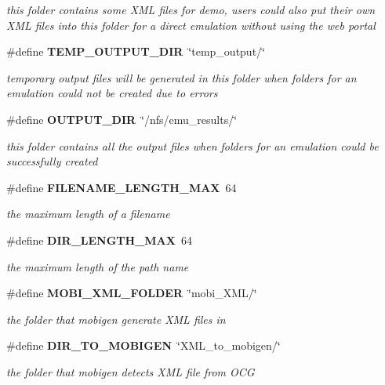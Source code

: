 \begin{CompactItemize}
\begin{CompactList}\small\item\em this folder contains some XML files for demo, users could also put their own XML files into this folder for a direct emulation without using the web portal \item\end{CompactList}\item 
\#define {\bf TEMP\_\-OUTPUT\_\-DIR}~\char`\"{}temp\_\-output/\char`\"{}
\begin{CompactList}\small\item\em temporary output files will be generated in this folder when folders for an emulation could not be created due to errors \item\end{CompactList}\item 
\#define {\bf OUTPUT\_\-DIR}~\char`\"{}/nfs/emu\_\-results/\char`\"{}
\begin{CompactList}\small\item\em this folder contains all the output files when folders for an emulation could be successfully created \item\end{CompactList}\item 
\#define {\bf FILENAME\_\-LENGTH\_\-MAX}~64
\begin{CompactList}\small\item\em the maximum length of a filename \item\end{CompactList}\item 
\#define {\bf DIR\_\-LENGTH\_\-MAX}~64
\begin{CompactList}\small\item\em the maximum length of the path name \item\end{CompactList}\item 
\#define {\bf MOBI\_\-XML\_\-FOLDER}~\char`\"{}mobi\_\-XML/\char`\"{}
\begin{CompactList}\small\item\em the folder that mobigen generate XML files in \item\end{CompactList}\item 
\#define {\bf DIR\_\-TO\_\-MOBIGEN}~\char`\"{}XML\_\-to\_\-mobigen/\char`\"{}
\begin{CompactList}\small\item\em the folder that mobigen detects XML file from OCG \item\end{CompactList}\end{CompactItemize}


